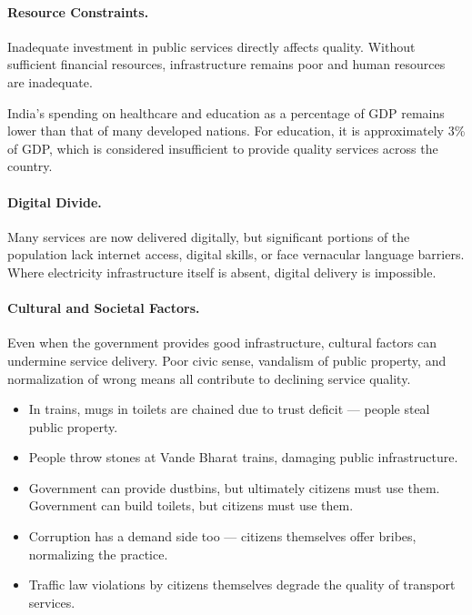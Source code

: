 \paragraph{Resource Constraints.} Inadequate investment in public services directly affects quality. Without sufficient financial resources, infrastructure remains poor and human resources are inadequate.

\begin{DataFact}
India's spending on healthcare and education as a percentage of GDP remains lower than that of many developed nations. For education, it is approximately 3\% of GDP, which is considered insufficient to provide quality services across the country.
\end{DataFact}

\paragraph{Digital Divide.} Many services are now delivered digitally, but significant portions of the population lack internet access, digital skills, or face vernacular language barriers. Where electricity infrastructure itself is absent, digital delivery is impossible.

\paragraph{Cultural and Societal Factors.} Even when the government provides good infrastructure, cultural factors can undermine service delivery. Poor civic sense, vandalism of public property, and normalization of wrong means all contribute to declining service quality.

\begin{ExampleBox}
\begin{itemize}
\item In trains, mugs in toilets are chained due to trust deficit --- people steal public property.
\item People throw stones at Vande Bharat trains, damaging public infrastructure.
\item Government can provide dustbins, but ultimately citizens must use them. Government can build toilets, but citizens must use them.
\item Corruption has a demand side too --- citizens themselves offer bribes, normalizing the practice.
\item Traffic law violations by citizens themselves degrade the quality of transport services.
\end{itemize}
\end{ExampleBox}

